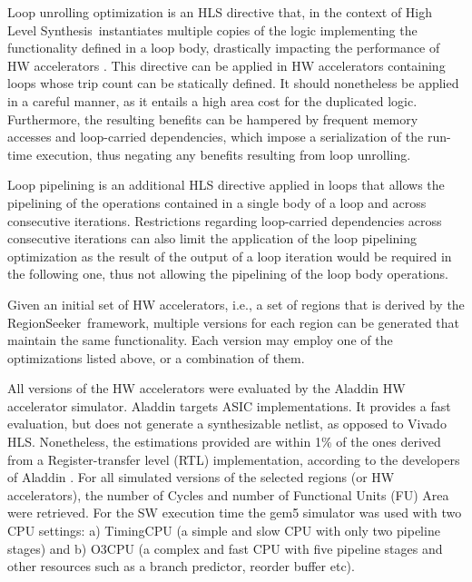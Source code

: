 \documentclass[]{usiinfthesis}
\newcommand{\rseeker}{{RegionSeeker}}
\newcommand{\HLS}{{High Level Synthesis}}
\begin{document}
Loop unrolling optimization is an HLS directive that, in the context of \HLS\, instantiates multiple 
copies of the logic implementing the functionality defined in a loop body, drastically impacting the 
performance of HW accelerators \cite{KurraApr07} \cite{KulkarniOct12}. This directive can be applied in HW
accelerators containing loops whose trip count can be statically defined. It should nonetheless
be applied in a careful manner, as it entails a high area cost for the duplicated logic. Furthermore,
the resulting benefits can be hampered by frequent memory accesses and loop-carried dependencies, which 
impose a serialization of the run-time execution, thus negating any benefits resulting from loop unrolling.\par

Loop pipelining is an additional HLS directive applied in loops that allows the pipelining of 
the operations contained in a single body of a loop and across consecutive iterations. Restrictions 
regarding loop-carried dependencies across consecutive iterations can also limit the application of the loop
pipelining optimization as the result of the output of a loop iteration would be required in the following
one, thus not allowing the pipelining of the loop body operations.\par

Given an initial set of HW accelerators, i.e., a set of regions that is derived by the \rseeker\ framework, 
multiple versions for each region can be generated that maintain the same functionality.
Each version may employ one of the optimizations listed above, or a combination of them.
\par

All versions of the HW accelerators were evaluated by the Aladdin HW accelerator simulator.  
Aladdin targets ASIC implementations. It provides a fast evaluation, but does not generate a 
synthesizable netlist,
as opposed to Vivado HLS. Nonetheless, the estimations provided are
within 1\% of the ones derived from a Register-transfer level (RTL) implementation, according to 
the developers of Aladdin \cite{ShaoJul14}.
For all simulated versions of the selected regions (or HW accelerators), the number of Cycles and number 
of Functional Units (FU) Area were retrieved. For the SW execution time the gem5 simulator 
\cite{BinkertFeb11}
was used with two CPU settings: a) TimingCPU  (a simple and slow CPU with only two pipeline stages)
and b) O3CPU (a complex and fast CPU with five pipeline stages and other resources such as a 
branch predictor, reorder buffer etc). \par
\end{document}
